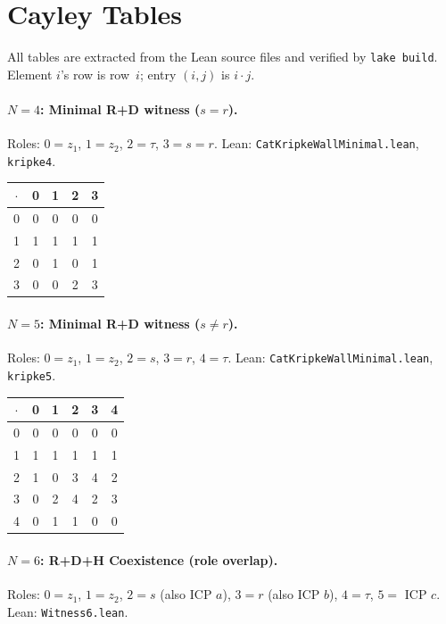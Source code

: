 \documentclass[a4paper,UKenglish,cleveref,autoref,thm-restate]{lipics-v2021}
\newcommand{\dotop}{\cdot}
\begin{document}
\appendix

\section{Cayley Tables}
\label{app:tables}

All tables are extracted from the Lean source files and verified by \texttt{lake build}. Element $i$'s row is row~$i$; entry $(i,j)$ is $i \dotop j$.

\paragraph{$N\!=\!4$: Minimal R+D witness ($s = r$).}
Roles: $0 = z_1$, $1 = z_2$, $2 = \tau$, $3 = s = r$. \quad Lean: \texttt{CatKripkeWallMinimal.lean}, \texttt{kripke4}.

\medskip
{\small
\begin{tabular}{c|cccc}
$\dotop$ & 0 & 1 & 2 & 3 \\\hline
0 & 0 & 0 & 0 & 0 \\
1 & 1 & 1 & 1 & 1 \\
2 & 0 & 1 & 0 & 1 \\
3 & 0 & 0 & 2 & 3 \\
\end{tabular}}

\paragraph{$N\!=\!5$: Minimal R+D witness ($s \neq r$).}
Roles: $0 = z_1$, $1 = z_2$, $2 = s$, $3 = r$, $4 = \tau$. \quad Lean: \texttt{CatKripkeWallMinimal.lean}, \texttt{kripke5}.

\medskip
{\small
\begin{tabular}{c|ccccc}
$\dotop$ & 0 & 1 & 2 & 3 & 4 \\\hline
0 & 0 & 0 & 0 & 0 & 0 \\
1 & 1 & 1 & 1 & 1 & 1 \\
2 & 1 & 0 & 3 & 4 & 2 \\
3 & 0 & 2 & 4 & 2 & 3 \\
4 & 0 & 1 & 1 & 0 & 0 \\
\end{tabular}}

\paragraph{$N\!=\!6$: R+D+H Coexistence (role overlap).}
Roles: $0 = z_1$, $1 = z_2$, $2 = s$ (also ICP $a$), $3 = r$ (also ICP $b$), $4 = \tau$, $5 =$ ICP $c$. \quad Lean: \texttt{Witness6.lean}.
\end{document}
